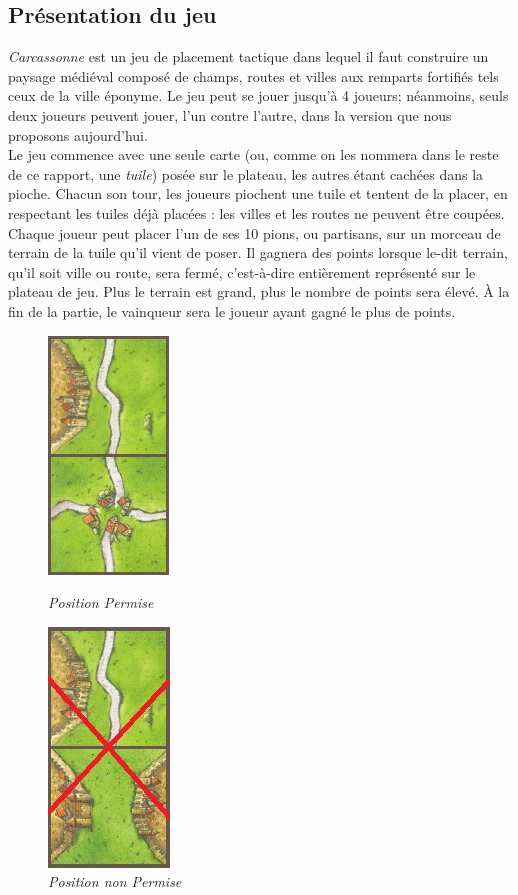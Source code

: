 \documentclass[a4paper, 11pt]{article}
\begin{document}
    \subsection{Présentation du jeu}\label{sec:presentation-jeu}
        \emph{Carcassonne} est un jeu de placement tactique dans lequel il faut construire un paysage médiéval composé de champs, routes et villes aux remparts fortifiés tels ceux de la ville éponyme. Le jeu peut se jouer jusqu'à 4 joueurs; néanmoins, seuls deux joueurs peuvent jouer, l'un contre l'autre, dans la version que nous proposons aujourd'hui.\\
	    \indent Le jeu commence avec une seule carte (ou, comme on les nommera dans le reste de ce rapport, une \textit{tuile}) posée sur le plateau, les autres étant cachées dans la pioche. Chacun son tour, les joueurs piochent une tuile et tentent de la placer, en respectant les tuiles déjà placées : les villes et les routes ne peuvent être coupées. Chaque joueur peut placer l'un de ses 10 pions, ou partisans, sur un morceau de terrain de la tuile qu'il vient de poser. Il gagnera des points lorsque le-dit terrain, qu'il soit ville ou route, sera fermé, c'est-à-dire entièrement représenté sur le plateau de jeu. Plus le terrain est grand, plus le nombre de points sera élevé. À la fin de la partie, le vainqueur sera le joueur ayant gagné le plus de points.
    
    \begin{figure}[H]
    \begin{minipage}[b]{0.50\linewidth}
      \centering \includegraphics[scale=0.68]{img/img1.jpg}
      \caption{\it Position Permise}
   \end{minipage}\hfill
    \begin{minipage}[b]{0.50\linewidth}
      \centering \includegraphics[scale=0.68]{img/img2.jpg}
      \caption{\it Position non Permise}
   \end{minipage}\hfill
    \label{fig:1}
    \end{figure}
    
\end{document}
